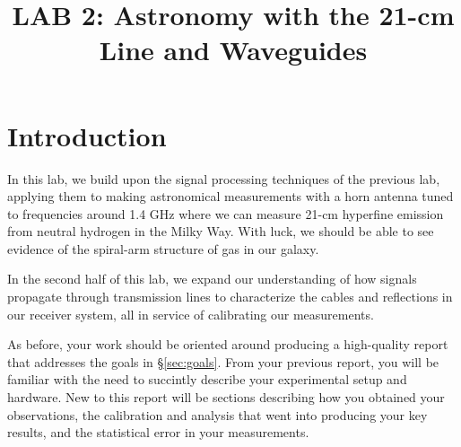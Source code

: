 \documentclass[11pt,preprint]{aastex}
\begin{document}
\def\simlt{\lower.5ex\hbox{$\; \buildrel < \over \sim \;$}}
\def\simgt{\lower.5ex\hbox{$\; \buildrel > \over \sim \;$}}

\title {LAB 2: Astronomy with the 21-cm Line and Waveguides}

\tableofcontents

\section{Introduction}

\noindent
In this lab, we build upon the signal processing techniques of the previous lab,
applying them to making astronomical measurements with a horn antenna
tuned to frequencies around 1.4 GHz where we can measure 21-cm hyperfine
emission from neutral hydrogen in the Milky Way.  With luck, we should be able
to see evidence of the spiral-arm structure of gas in our galaxy.

In the second half of this lab, we expand our understanding of how signals
propagate through transmission lines to characterize the
cables and reflections in our receiver system, all in service of calibrating
our measurements.

As before, your work should be oriented around producing a high-quality report that
addresses the goals in \S\ref{sec:goals}. From your previous report, you will
be familiar with the need to succintly describe your experimental setup and hardware.
New to this report will be sections describing how you obtained your observations,
the calibration and analysis that went into producing your key results, and the
statistical error in your measurements.
\end{document}

